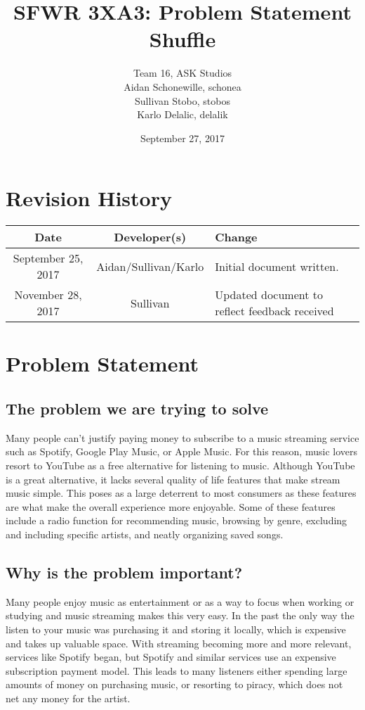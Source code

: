\documentclass[12pt, a4paper]{article}
\title{SFWR 3XA3: Problem Statement Shuffle}
\author{Team 16, ASK Studios
        \\ Aidan Schonewille, schonea
        \\ Sullivan Stobo, stobos
        \\ Karlo Delalic, delalik
}
\begin{document}
\date{September 27, 2017}

\section*{Revision History}
\begin{center}
\begin{tabular}{| c | c | p{6cm} |}
\hline
\textbf{Date} & \textbf{Developer(s)} & \textbf{Change}\\
\hline
September 25, 2017 & Aidan/Sullivan/Karlo & Initial document written.\\
\hline
November 28, 2017 & Sullivan & Updated document to reflect feedback received \\
\hline
\end{tabular}
\end{center}

\maketitle
\section{Problem Statement}
\subsection{The problem we are trying to solve}
Many people can't justify paying money to subscribe to a music streaming service such as Spotify, Google Play Music, or Apple Music. For this reason, music lovers resort to YouTube as a free alternative for listening to music. Although YouTube is a great alternative, it lacks several quality of life features that make stream music simple. This poses as a large deterrent to most consumers as these features are what make the overall experience more enjoyable. Some of these features include a radio function for recommending music, browsing by genre, excluding and including specific artists, and neatly organizing saved songs.

\subsection{Why is the problem important?}
Many people enjoy music as entertainment or as a way to focus when working or studying and music streaming makes this very easy. In the past the only way the listen to your music was purchasing it and storing it locally, which is expensive and takes up valuable space.  With streaming becoming more and more relevant, services like Spotify began, but Spotify and similar services use an expensive subscription payment model.  This leads to many listeners either spending large amounts of money on purchasing music, or resorting to piracy, which does not net any money for the artist.
\end{document}
